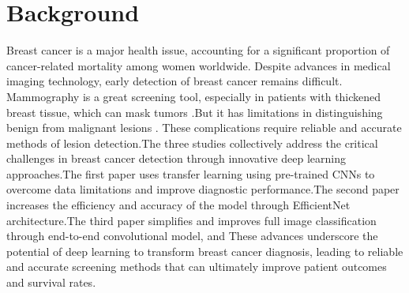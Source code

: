 \documentclass[12]{article}
\begin{document}
\section{Background}
Breast cancer is a major health issue, accounting for a significant proportion of cancer-related mortality among women worldwide. Despite advances in medical imaging technology, early detection of breast cancer remains difficult. Mammography is a great screening tool, especially in patients with thickened breast tissue, which can mask tumors .But it  has limitations in distinguishing benign from malignant lesions . These complications require reliable and accurate methods of lesion detection.The three studies collectively address the critical challenges in breast cancer detection through innovative deep learning approaches.The first paper  uses transfer learning using pre-trained CNNs to overcome data limitations and improve diagnostic performance.\cite{9427477}The second paper increases the efficiency and accuracy of the model through EfficientNet architecture.\cite{10151156}The third paper simplifies and improves full image classification through end-to-end convolutional model,\cite{shen2019deep} and  These advances underscore the potential of deep learning to transform breast cancer diagnosis, leading to reliable and accurate screening methods that can ultimately improve patient outcomes and survival rates.
\end{document}
